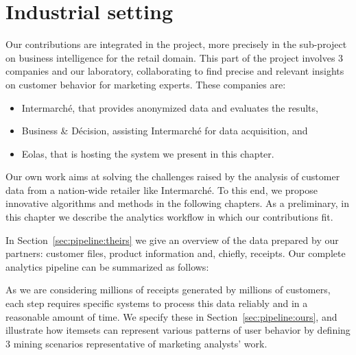 \chapter{Industrial setting}
\label{chap:model}


\minitoc



Our contributions are integrated in the \datalyse project,
more precisely in the sub-project on business intelligence for the retail domain.
This part of the project involves 3 companies and our laboratory,
collaborating to find precise and relevant insights on customer behavior for marketing experts.
These companies are:
\begin{itemize}
	\item Intermarch\'e, that provides anonymized data and evaluates the  results,
	\item Business \& D\'ecision, assisting Intermarch\'e for data acquisition, and
	\item Eolas, that is hosting the system we present in this chapter.
\end{itemize}

Our own work aims at solving the challenges raised by the analysis of customer data
from a nation-wide retailer like Intermarch\'e.
To this end, we propose innovative algorithms and methods in the following chapters.
As a preliminary, in this chapter we describe the analytics workflow in which our contributions fit.


In Section~\ref{sec:pipeline:theirs} we give an overview of the data prepared by our partners:
customer files, product information and, chiefly, receipts.
Our complete analytics pipeline can be summarized as follows:



As we are considering millions of receipts generated by millions of customers,
each step requires specific systems to process this data reliably and in a reasonable amount of time.
We specify these in Section~\ref{sec:pipeline:ours},
and illustrate how itemsets can represent various patterns of user behavior
by defining 3 mining scenarios representative of marketing analysts' work.


